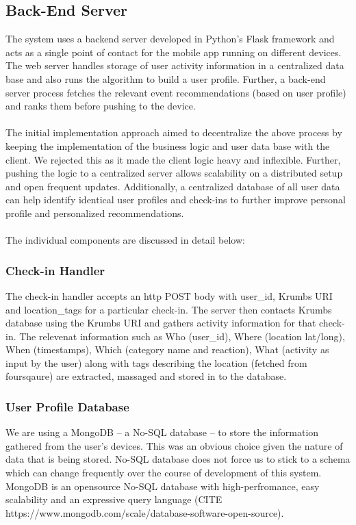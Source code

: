 \documentclass[12pt,letterpaper]{article}
\begin{document}
\subsection{Back-End Server}
The system uses a backend server developed in Python's Flask framework \cite{flask} and acts as a single point of contact for the mobile app running on different devices. The web server handles storage of user activity information in a centralized data base and also runs the algorithm to build a user profile. Further, a back-end server process fetches the relevant event recommendations (based on user profile) and ranks them before pushing to the device.
\\\\
The initial implementation approach aimed to decentralize the above process by keeping the implementation of the business logic and user data base with the client. We rejected this as it made the client logic heavy and inflexible. Further, pushing the logic to a centralized server allows scalability on a distributed setup and open frequent updates. Additionally, a centralized database of all user data can help identify identical user profiles and check-ins to further improve personal profile and personalized recommendations.
\\\\
The individual components are discussed in detail below:
\subsubsection{Check-in Handler}
The check-in handler accepts an http POST body with user\_id, Krumbs URI and location\_tags for a particular check-in. The server then contacts Krumbs database using the Krumbs URI and gathers activity information for that check-in. The relevenat information such as Who (user\_id), Where (location lat/long), When (timestamps), Which (category name and reaction), What (activity as input by the user) along with tags describing the location (fetched from foursqaure) are extracted, massaged and stored in to the database.

\subsubsection{User Profile Database}
We are using a MongoDB -- a No-SQL database -- to store the information gathered from the user's devices. This was an obvious choice given the nature of data that is being stored. No-SQL database does not force us to stick to a schema which can change frequently over the course of development of this system. MongoDB is an opensource No-SQL database with high-perfromance, easy scalability and an expressive query language (CITE https://www.mongodb.com/scale/database-software-open-source). 
\end{document}
